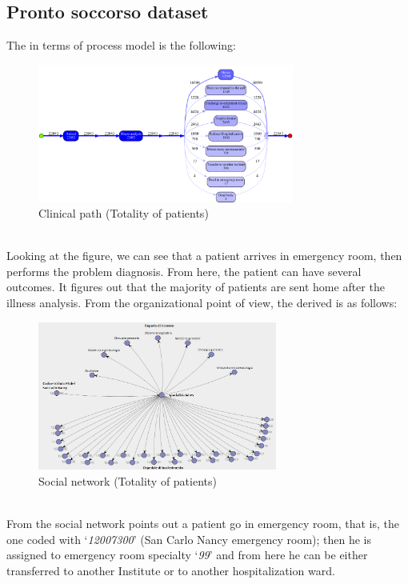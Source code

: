 \subsection{Pronto soccorso dataset}\label{analysis:2}
The  in terms of process model is the following:
\begin{figure} [htbp]
\includegraphics[width=0.75\textwidth, keepaspectratio]{ProntoSoccorsoInductiveVisualMiner}
\caption{Clinical path (Totality of patients)}
\end{figure}\\
Looking at the figure, we can see that a patient arrives in emergency room, then performs the problem diagnosis. From here, the patient can have several outcomes. It figures out that the majority of patients are sent home after the illness analysis. From the organizational point of view, the  derived is as follows:
\begin{figure} [htbp]
\includegraphics[width=0.7\textwidth, keepaspectratio]{ProntoSoccorsoSocialNetwork}
\caption{Social network (Totality of patients)}
\end{figure}\\
From the social network points out a patient go in emergency room, that is, the one coded with `\textit{12007300}' (San Carlo Nancy emergency room); then he is assigned to emergency room specialty `\textit{99}' and from here he can be either transferred to another Institute or to another hospitalization ward.
